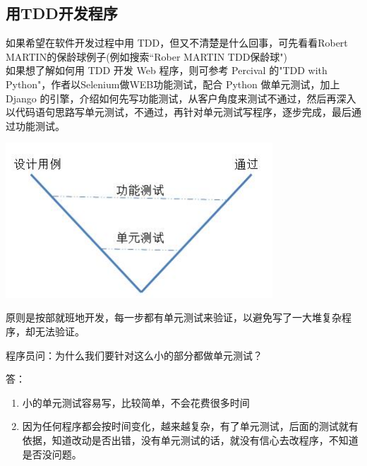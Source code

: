 \hypertarget{ux6bcfux5c0fux6b65ux9a8cux8bc1}{%
\subsection{用TDD开发程序}\label{ux6bcfux5c0fux6b65ux9a8cux8bc1}}

如果希望在软件开发过程中用 TDD，但又不清楚是什么回事，可先看看Robert
MARTIN的保龄球例子(例如搜索``Rober MARTIN TDD保龄球")\\
如果想了解如何用 TDD 开发 Web 程序，则可参考 Percival 的"TDD with
Python"，作者以Selenium做WEB功能测试，配合 Python 做单元测试，加上
Django
的引擎，介绍如何先写功能测试，从客户角度来测试不通过，然后再深入以代码语句思路写单元测试，不通过，再针对单元测试写程序，逐步完成，最后通过功能测试。


\includegraphics[width=10cm]{测试.jpg}

原则是按部就班地开发，每一步都有单元测试来验证，以避免写了一大堆复杂程序，却无法验证。

程序员问：为什么我们要针对这么小的部分都做单元测试？

答：

\begin{enumerate}
\tightlist
\item
  小的单元测试容易写，比较简单，不会花费很多时间
\item
  因为任何程序都会按时间变化，越来越复杂，有了单元测试，后面的测试就有依据，知道改动是否出错，没有单元测试的话，就没有信心去改程序，不知道是否没问题。
\end{enumerate}

\begin{description}
\item[]
\end{description}

